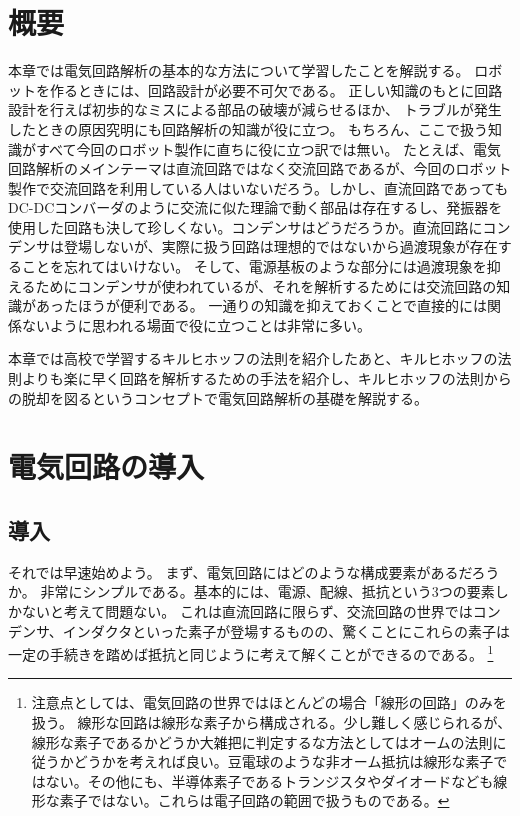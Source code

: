 \documentclass{ltjsreport}
\begin{document}
\section{概要}
本章では電気回路解析の基本的な方法について学習したことを解説する。
ロボットを作るときには、回路設計が必要不可欠である。
正しい知識のもとに回路設計を行えば初歩的なミスによる部品の破壊が減らせるほか、
トラブルが発生したときの原因究明にも回路解析の知識が役に立つ。
もちろん、ここで扱う知識がすべて今回のロボット製作に直ちに役に立つ訳では無い。
たとえば、電気回路解析のメインテーマは直流回路ではなく交流回路であるが、今回のロボット製作で交流回路を利用している人はいないだろう。しかし、直流回路であってもDC-DCコンバーダのように交流に似た理論で動く部品は存在するし、発振器を使用した回路も決して珍しくない。コンデンサはどうだろうか。直流回路にコンデンサは登場しないが、実際に扱う回路は理想的ではないから過渡現象が存在することを忘れてはいけない。
そして、電源基板のような部分には過渡現象を抑えるためにコンデンサが使われているが、それを解析するためには交流回路の知識があったほうが便利である。
一通りの知識を抑えておくことで直接的には関係ないように思われる場面で役に立つことは非常に多い。

本章では高校で学習するキルヒホッフの法則を紹介したあと、キルヒホッフの法則よりも楽に早く回路を解析するための手法を紹介し、キルヒホッフの法則からの脱却を図るというコンセプトで電気回路解析の基礎を解説する。

\section{電気回路の導入}
\subsection{導入}
それでは早速始めよう。
まず、電気回路にはどのような構成要素があるだろうか。
非常にシンプルである。基本的には、電源、配線、抵抗という3つの要素しかないと考えて問題ない。
これは直流回路に限らず、交流回路の世界ではコンデンサ、インダクタといった素子が登場するものの、驚くことにこれらの素子は一定の手続きを踏めば抵抗と同じように考えて解くことができるのである。
\footnote{注意点としては、電気回路の世界ではほとんどの場合「線形の回路」のみを扱う。
線形な回路は線形な素子から構成される。少し難しく感じられるが、線形な素子であるかどうか大雑把に判定するな方法としてはオームの法則に従うかどうかを考えれば良い。豆電球のような非オーム抵抗は線形な素子ではない。その他にも、半導体素子であるトランジスタやダイオードなども線形な素子ではない。これらは電子回路の範囲で扱うものである。}
\end{document}
